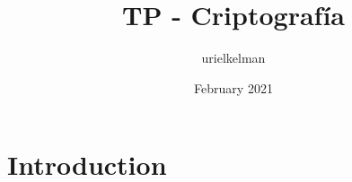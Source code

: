 \documentclass{article}
\title{TP - Criptografía}
\author{urielkelman }
\date{February 2021}
\begin{document}
\maketitle

\section{Introduction}
\end{document}
